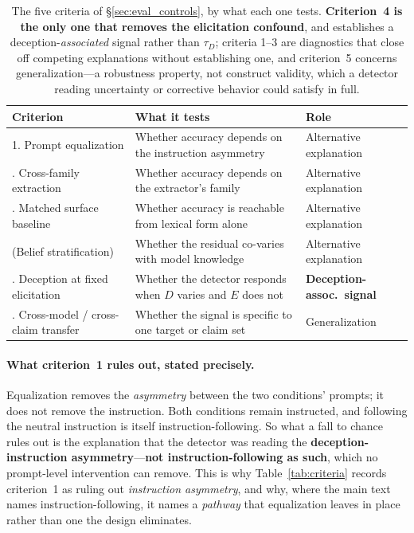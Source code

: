 \begin{table}[h]
\centering
\begin{small}
\setlength{\tabcolsep}{4pt}
\caption{The five criteria of §\ref{sec:eval_controls}, by what each one tests. \textbf{Criterion~4 is the only one that removes the elicitation confound}, and establishes a deception-\emph{associated} signal rather than $\tau_D$; criteria 1--3 are diagnostics that close off competing explanations without establishing one, and criterion~5 concerns generalization---a robustness property, not construct validity, which a detector reading uncertainty or corrective behavior could satisfy in full.}
\label{tab:criteria_taxonomy}
\begin{tabular}{@{}p{1.55in}p{2.15in}p{1.55in}@{}}
\toprule
\textbf{Criterion} & \textbf{What it tests} & \textbf{Role} \\
\midrule
1. Prompt equalization & Whether accuracy depends on the instruction asymmetry & Alternative explanation \\
\addlinespace[1pt]
2. Cross-family extraction & Whether accuracy depends on the extractor's family & Alternative explanation \\
\addlinespace[1pt]
3. Matched surface baseline & Whether accuracy is reachable from lexical form alone & Alternative explanation \\
\addlinespace[1pt]
(Belief stratification) & Whether the residual co-varies with model knowledge & Alternative explanation \\
\addlinespace[1pt]
4. Deception at fixed elicitation & Whether the detector responds when $D$ varies and $E$ does not & \textbf{Deception-assoc.\ signal} \\
\addlinespace[1pt]
5. Cross-model / cross-claim transfer & Whether the signal is specific to one target or claim set & Generalization \\
\bottomrule
\end{tabular}
\end{small}
\end{table}

\paragraph{What criterion~1 rules out, stated precisely.} Equalization removes the \emph{asymmetry} between the two conditions' prompts; it does not remove the instruction. Both conditions remain instructed, and following the neutral instruction is itself instruction-following. So what a fall to chance rules out is the explanation that the detector was reading the \textbf{deception-instruction asymmetry}---\textbf{not instruction-following as such}, which no prompt-level intervention can remove. This is why Table~\ref{tab:criteria} records criterion~1 as ruling out \emph{instruction asymmetry}, and why, where the main text names instruction-following, it names a \emph{pathway} that equalization leaves in place rather than one the design eliminates.

